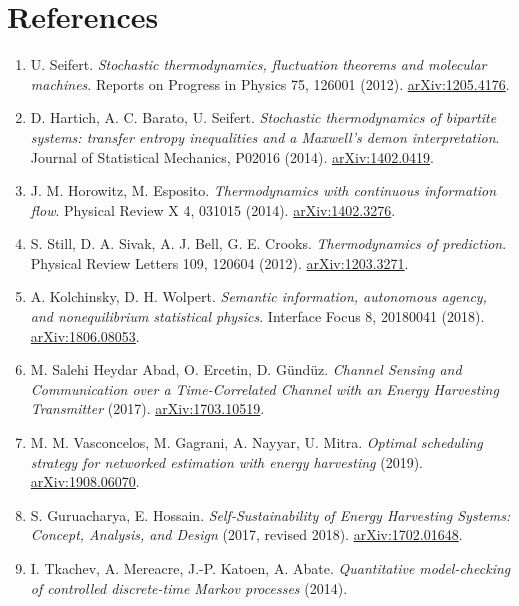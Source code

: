 \documentclass[
  11pt,
]{article}
\newcounter{none} %
\begin{document}
\section{References}\label{references}

\begin{enumerate}
\def\labelenumi{\arabic{enumi}.}
\item
  U. Seifert. \emph{Stochastic thermodynamics, fluctuation theorems and
  molecular machines}. Reports on Progress in Physics 75, 126001 (2012).
  \href{https://arxiv.org/abs/1205.4176}{arXiv:1205.4176}.
\item
  D. Hartich, A. C. Barato, U. Seifert. \emph{Stochastic thermodynamics
  of bipartite systems: transfer entropy inequalities and a Maxwell's
  demon interpretation}. Journal of Statistical Mechanics, P02016
  (2014). \href{https://arxiv.org/abs/1402.0419}{arXiv:1402.0419}.
\item
  J. M. Horowitz, M. Esposito. \emph{Thermodynamics with continuous
  information flow}. Physical Review X 4, 031015 (2014).
  \href{https://arxiv.org/abs/1402.3276}{arXiv:1402.3276}.
\item
  S. Still, D. A. Sivak, A. J. Bell, G. E. Crooks. \emph{Thermodynamics
  of prediction}. Physical Review Letters 109, 120604 (2012).
  \href{https://arxiv.org/abs/1203.3271}{arXiv:1203.3271}.
\item
  A. Kolchinsky, D. H. Wolpert. \emph{Semantic information, autonomous
  agency, and nonequilibrium statistical physics}. Interface Focus 8,
  20180041 (2018).
  \href{https://arxiv.org/abs/1806.08053}{arXiv:1806.08053}.
\item
  M. Salehi Heydar Abad, O. Ercetin, D. Gündüz. \emph{Channel Sensing
  and Communication over a Time-Correlated Channel with an Energy
  Harvesting Transmitter} (2017).
  \href{https://arxiv.org/abs/1703.10519}{arXiv:1703.10519}.
\item
  M. M. Vasconcelos, M. Gagrani, A. Nayyar, U. Mitra. \emph{Optimal
  scheduling strategy for networked estimation with energy harvesting}
  (2019). \href{https://arxiv.org/abs/1908.06070}{arXiv:1908.06070}.
\item
  S. Guruacharya, E. Hossain. \emph{Self-Sustainability of Energy
  Harvesting Systems: Concept, Analysis, and Design} (2017, revised
  2018). \href{https://arxiv.org/abs/1702.01648}{arXiv:1702.01648}.
\item
  I. Tkachev, A. Mereacre, J.-P. Katoen, A. Abate. \emph{Quantitative
  model-checking of controlled discrete-time Markov processes} (2014).

\end{enumerate}
\end{document}
